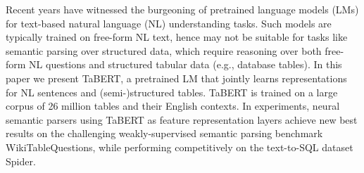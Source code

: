 Recent years have witnessed the burgeoning of pretrained language models (LMs) for text-based natural language (NL) understanding tasks. Such models are typically trained on free-form NL text, hence may not be suitable for tasks like semantic parsing over structured data, which require reasoning over both free-form NL questions and structured tabular data (e.g., database tables). In this paper we present TaBERT, a pretrained LM that jointly learns representations for NL sentences and (semi-)structured tables. TaBERT is trained on a large corpus of 26 million tables and their English  contexts. In experiments, neural semantic parsers using TaBERT as feature representation layers achieve new best results on the challenging weakly-supervised semantic parsing benchmark WikiTableQuestions, while performing competitively on the text-to-SQL dataset Spider.
